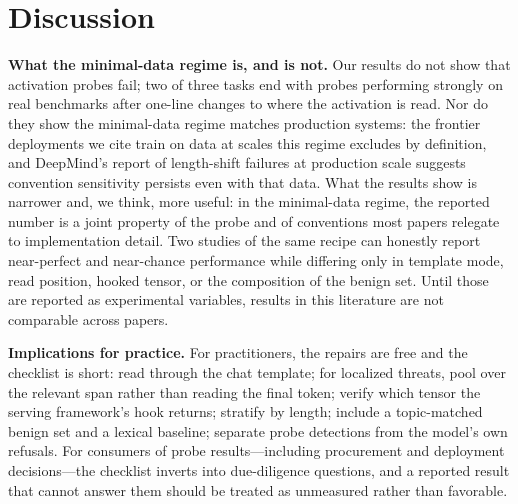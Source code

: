 \section{Discussion}
\label{sec:discussion}

\textbf{What the minimal-data regime is, and is not.} Our results do not show that activation probes fail; two of
three tasks end with probes performing strongly on real benchmarks after one-line changes to where the activation is
read. Nor do they show the minimal-data regime matches production systems: the frontier deployments we cite train on
data at scales this regime excludes by definition, and DeepMind's report of length-shift failures at production scale
\cite{gdm2026probes} suggests convention sensitivity persists even with that data. What the results show is narrower
and, we think, more useful: in the minimal-data regime, the reported number is a joint property of the probe and of
conventions most papers relegate to implementation detail. Two studies of the same recipe can honestly report
near-perfect and near-chance performance while differing only in template mode, read position, hooked tensor, or the
composition of the benign set. Until those are reported as experimental variables, results in this literature are not
comparable across papers.

\textbf{Implications for practice.} For practitioners, the repairs are free and the checklist is short: read through
the chat template; for localized threats, pool over the relevant span rather than reading the final token; verify
which tensor the serving framework's hook returns; stratify by length; include a topic-matched benign set and a
lexical baseline; separate probe detections from the model's own refusals. For consumers of probe
results---including procurement and deployment decisions---the checklist inverts into due-diligence questions, and a
reported result that cannot answer them should be treated as unmeasured rather than favorable.

